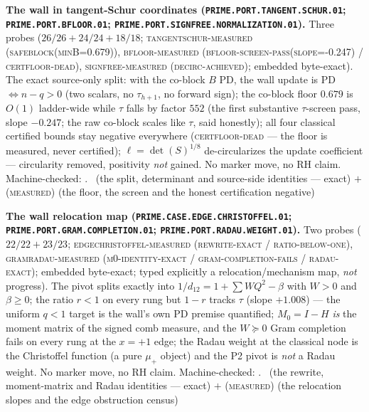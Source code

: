 \par\smallskip\noindent\textbf{The wall in tangent-Schur
coordinates (\texttt{PRIME.PORT.TANGENT.\allowbreak SCHUR.01};
\texttt{PRIME.PORT.\allowbreak BFLOOR.01};
\texttt{PRIME.PORT.SIGNFREE.\allowbreak NORMALIZATION.01}).}
Three probes ($26/26 + 24/24 + 18/18$;
\textsc{tangentschur-measured (safeblock(minB=0.679))},
\textsc{bfloor-measured (bfloor-screen-pass(slope=-0.247) /
certfloor-dead)}, \textsc{signfree-measured (decirc-achieved)};
embedded byte-exact).  The exact source-only split: with the
co-block $B$ PD, the wall update is PD $\iff n - q > 0$ (two
scalars, no $\tau_{h+1}$, no forward sign); the co-block floor
$0.679$ is $O(1)$ ladder-wide while $\tau$ falls by factor $552$
(the first substantive $\tau$-screen pass, slope $-0.247$; the
raw co-block scales like $\tau$, said honestly); all four
classical certified bounds stay negative everywhere
(\textsc{certfloor-dead} --- the floor is measured, never
certified); $\ell = \det(S)^{1/8}$ de-circularizes the update
coefficient --- circularity removed, positivity \emph{not}
gained.  No marker move, no RH claim.
Machine-checked: .
\mE\ (the split, determinant and source-side identities ---
exact) $+$ (\textsc{measured}) (the floor, the screen and the
honest certification negative)
\par\smallskip


\par\smallskip\noindent\textbf{The wall relocation map
(\texttt{PRIME.CASE.EDGE.\allowbreak CHRISTOFFEL.01};
\texttt{PRIME.PORT.GRAM.\allowbreak COMPLETION.01};
\texttt{PRIME.PORT.RADAU.\allowbreak WEIGHT.01}).}
Two probes ($22/22 + 23/23$; \textsc{edgechristoffel-measured
(rewrite-exact / ratio-below-one)}, \textsc{gramradau-measured
(m0-identity-exact / gram-completion-fails / radau-exact)};
embedded byte-exact; typed explicitly a relocation/mechanism
map, \emph{not} progress).  The pivot splits exactly into
$1/d_{12} = 1 + \sum W Q^2 - \beta$ with $W > 0$ and $\beta \ge
0$; the ratio $r < 1$ on every rung but $1 - r$ tracks $\tau$
(slope $+1.008$) --- the uniform $q < 1$ target is the wall's
own PD premise quantified; $M_0 = I - H$ \emph{is} the moment
matrix of the signed comb measure, and the $W \succeq 0$ Gram
completion fails on every rung at the $x = +1$ edge; the Radau
weight at the classical node is the Christoffel function (a pure
$\mu_+$ object) and the P2 pivot is \emph{not} a Radau weight.
No marker move, no RH claim.
Machine-checked: .
\mE\ (the rewrite, moment-matrix and Radau identities --- exact)
$+$ (\textsc{measured}) (the relocation slopes and the edge
obstruction census)
\par\smallskip


